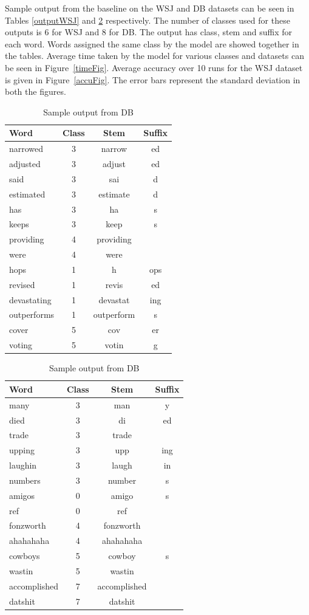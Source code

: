 \documentclass{article}
\begin{document}
Sample output from the baseline on the WSJ and DB datasets can be seen 
in Tables \ref{outputWSJ} and \ref{outputDB} respectively. The number 
of classes used for these outputs is 6 for WSJ and 8 for DB. The output
 has class, stem and suffix for each word. Words assigned the same class
 by the model are showed together in the tables. Average time taken by 
the model for various classes and datasets can be seen in 
Figure~\ref{timeFig}. Average accuracy over 10 runs for the WSJ dataset 
 is given in Figure~\ref{accuFig}. The error bars represent the standard
 deviation in both the figures.


\begin{table}[ht]
\begin{minipage}[b]{0.5\linewidth}\centering
\begin{tabular}{lccc}
\hline
Word & Class & Stem & Suffix \\
\hline
narrowed&3&narrow&ed \\
adjusted&3&adjust&ed \\
said&3&sai&d \\
estimated&3&estimate&d \\
has&3&ha&s \\
keeps&3&keep&s \\
providing & 4 & providing & \\
were&4&were& \\
hops&1&h&ops \\ 
revised&1&revis&ed \\
devastating&1&devastat&ing\\
outperforms&1&outperform&s\\
cover&5&cov&er \\
voting&5&votin&g \\
\hline
 \end{tabular}
\caption{\label{outputWSJ} Sample output from WSJ}
\end{minipage}
\begin{minipage}[b]{0.5\linewidth}\centering
\begin{tabular}{lccc}
\hline
  Word & Class & Stem & Suffix \\
\hline
many & 3 & man & y \\
died & 3 & di & ed \\
trade & 3 & trade &  \\
upping & 3 & upp & ing \\
laughin & 3 & laugh & in \\
numbers & 3 & number & s \\
amigos & 0 & amigo & s \\ 
ref & 0 & ref & \\
fonzworth & 4 & fonzworth & \\
ahahahaha & 4 & ahahahaha & \\
cowboys & 5 & cowboy & s \\
wastin & 5 & wastin & \\
accomplished & 7 & accomplished & \\
datshit & 7 & datshit & \\
\hline
 \end{tabular}
\caption{\label{outputDB} Sample output from DB}
\end{minipage}
\end{table}
\end{document}
